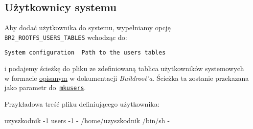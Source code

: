 \documentclass{article}
\newenvironment{textfile}{\ttfamily}{\par}
\begin{document}
\subsection{Użytkownicy systemu}

Aby dodać użytkownika do systemu, wypełniamy opcję \texttt{BR2\_ROOTFS\_USERS\_TABLES} wchodząc do:

\begin{center}
\texttt{System configuration \textrightarrow\ Path to the users tables}
\end{center}

\noindent i podajemy ścieżkę do pliku ze zdefiniowaną tablica użytkowników systemowych w formacie \href{https://buildroot.org/downloads/manual/manual.html#makeuser-syntax}{opisanym} w dokumentacji \emph{Buildroot'a}. Ścieżka ta zostanie przekazana jako parametr do~\href{https://github.com/maximeh/buildroot/blob/master/support/scripts/mkusers}{\texttt{mkusers}}.

\noindent Przykładowa treść pliku definiującego użytkownika:

\begin{center}
\begin{textfile}
uzyszkodnik -1 users -1 - /home/uzyszkodnik /bin/sh -
\end{textfile}
\end{center}


%
%
\end{document}
